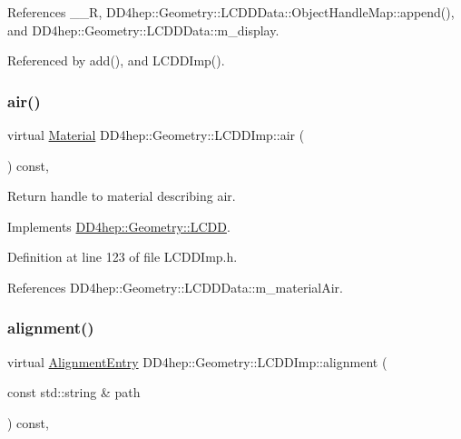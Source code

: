 References \+\_\+\+\_\+R, D\+D4hep\+::\+Geometry\+::\+L\+C\+D\+D\+Data\+::\+Object\+Handle\+Map\+::append(), and D\+D4hep\+::\+Geometry\+::\+L\+C\+D\+D\+Data\+::m\+\_\+display.



Referenced by add(), and L\+C\+D\+D\+Imp().

\hypertarget{class_d_d4hep_1_1_geometry_1_1_l_c_d_d_imp_a52ff3b93772cc1d6da6a27e7fbe5efd2}{}\label{class_d_d4hep_1_1_geometry_1_1_l_c_d_d_imp_a52ff3b93772cc1d6da6a27e7fbe5efd2} 
\subsubsection{\texorpdfstring{air()}{air()}}
{\footnotesize\ttfamily virtual \hyperlink{class_d_d4hep_1_1_geometry_1_1_material}{Material} D\+D4hep\+::\+Geometry\+::\+L\+C\+D\+D\+Imp\+::air (\begin{DoxyParamCaption}{ }\end{DoxyParamCaption}) const\hspace{0.3cm}{\ttfamily [inline]}, {\ttfamily [virtual]}}



Return handle to material describing air. 



Implements \hyperlink{class_d_d4hep_1_1_geometry_1_1_l_c_d_d_a35239d8469cba6c091e970a1baec312b}{D\+D4hep\+::\+Geometry\+::\+L\+C\+DD}.



Definition at line 123 of file L\+C\+D\+D\+Imp.\+h.



References D\+D4hep\+::\+Geometry\+::\+L\+C\+D\+D\+Data\+::m\+\_\+material\+Air.

\hypertarget{class_d_d4hep_1_1_geometry_1_1_l_c_d_d_imp_a7df29f33bdb55b92fd13ad4fc95c61fe}{}\label{class_d_d4hep_1_1_geometry_1_1_l_c_d_d_imp_a7df29f33bdb55b92fd13ad4fc95c61fe} 
\subsubsection{\texorpdfstring{alignment()}{alignment()}}
{\footnotesize\ttfamily virtual \hyperlink{class_d_d4hep_1_1_geometry_1_1_alignment_entry}{Alignment\+Entry} D\+D4hep\+::\+Geometry\+::\+L\+C\+D\+D\+Imp\+::alignment (\begin{DoxyParamCaption}\item[{const std\+::string \&}]{path }\end{DoxyParamCaption}) const\hspace{0.3cm}{\ttfamily [inline]}, {\ttfamily [virtual]}}



